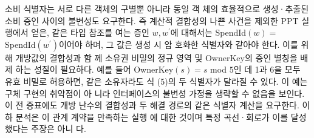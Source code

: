 소비 식별자는 서로 다른 객체의 구별뿐 아니라 동일 객
체의 효율적으로 생성·추출된 소비 증인 사이의 불변성도
요구한다. 즉 계산적 결합성의 나쁜 사건을 제외한 PPT 실
행에서 얻은, 같은 타입 참조를 여는 증인 \(w,w^{′}\)에 대해서는
SpendId\((w)=\) SpendId\((w^{′})\)이어야 하며, 그 값은 생성 시 암
호화한 식별자와 같아야 한다. 이를 위해 개방값의 결합성과 함
께 소유권 비밀의 정규 영역 및 OwnerKey의 증인 별칭을 배제
하는 성질이 필요하다. 예를 들어 OwnerKey\((s)=s\) mod \(5\)인
데 1과 6을 모두 유효 비밀로 허용하면, 같은 소유자라도 식 (5)의
두 식별자가 달라질 수 있다. 이 예는 구체 구현의 취약점이 아
니라 인터페이스의 불변성 가정을 생략할 수 없음을 보인다. 이
전 증표에도 개방 난수의 결합성과 두 해결 경로의 같은 식별자
계산을 요구한다. 이하 분석은 이 관계 계약을 만족하는 실행
에 대한 것이며 특정 곡선·회로가 이를 달성했다는 주장은 아니
다.
